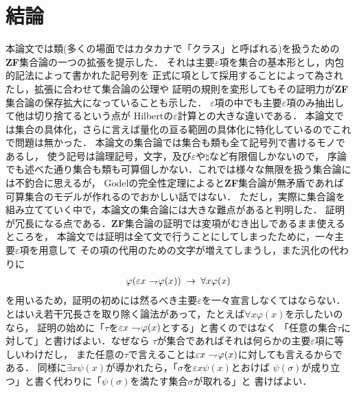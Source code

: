 \chapter{結論}
	本論文では類(多くの場面ではカタカナで「クラス」と呼ばれる)を扱うための{\bf ZF}集合論の一つの拡張を提示した．
	それは主要$\varepsilon$項を集合の基本形とし，内包的記法によって書かれた記号列を
	正式に項として採用することによって為されたし，拡張に合わせて集合論の公理や
	証明の規則を変形してもその証明力が{\bf ZF}集合論の保存拡大になっていることも示した．
	$\varepsilon$項の中でも主要$\varepsilon$項のみ抽出して他は切り捨てるという点が
	Hilbertの$\varepsilon$計算との大きな違いである．
	本論文では集合の具体化，さらに言えば量化の亘る範囲の具体化に特化しているのでこれで問題は無かった．
	本論文の集合論では集合も類も全て記号列で書けるモノであるし，
	使う記号は論理記号，文字，及び$\varepsilon$や$\natural$など有限個しかないので，
	序論でも述べた通り集合も類も可算個しかない．これでは様々な無限を扱う集合論には不釣合に思えるが，
	G$\ddot{\mbox{o}}$delの完全性定理によると{\bf ZF}集合論が無矛盾であれば
	可算集合のモデルが作れるのでおかしい話ではない．
	ただし，実際に集合論を組み立てていく中で，本論文の集合論には大きな難点があると判明した．
	証明が冗長になる点である．{\bf ZF}集合論の証明では変項がむき出しであるまま使えるところを，
	本論文では証明は全て文で行うことにしてしまったために，一々主要$\varepsilon$項を用意して
	その項の代用のための文字が増えてしまうし，また汎化の代わりに
	\begin{align}
		\varphi(\varepsilon x \rightharpoondown\hspace{-0.25em} \varphi(x)) \hspace{0.25em}\rightarrow\hspace{0.25em} \forall x \varphi(x)
	\end{align}
	を用いるため，証明の初めには然るべき主要$\varepsilon$を一々宣言しなくてはならない．
	とはいえ若干冗長さを取り除く論法があって，たとえば$\forall x \varphi(x)$を示したいのなら，
	証明の始めに「$\tau$を$\varepsilon x \rightharpoondown\hspace{-0.25em} \varphi(x)$とする」と書くのではなく
	「任意の集合$\tau$に対して」と書けばよい．なぜなら
	$\tau$が集合であればそれは何らかの主要$\varepsilon$項に等しいわけだし，
	また任意の$\tau$で言えることは$\varepsilon x \rightharpoondown\hspace{-0.25em} \varphi(x)$に対しても言えるからである．
	同様に$\exists x \psi(x)$が導かれたら，「$\sigma$を$\varepsilon x \psi(x)$とおけば
	$\psi(\sigma)$が成り立つ」と書く代わりに「$\psi(\sigma)$を満たす集合$\sigma$が取れる」と
	書けばよい．